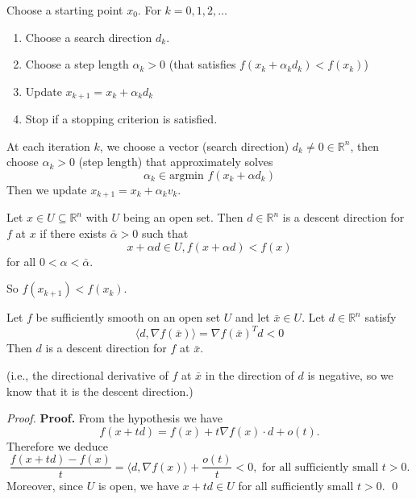 Choose a starting point $x_0$. For $k = 0,1,2,\ldots$
\begin{enumerate}
  \item Choose a search direction $d_k$.
  \item Choose a step length $\alpha_k > 0$ (that satisfies $f(x_k + \alpha_k d_k) < f(x_k)$)
  \item Update $x_{k+1} = x_k + \alpha_k d_k$
  \item Stop if a stopping criterion is satisfied.
\end{enumerate}
\begin{definition}
  At each iteration $k$, we choose a vector (search direction) $d_k \neq 0 \in \mathbb R^n$, then choose $\alpha_k > 0$ (step length) that approximately solves
$$\alpha_k \in \text{argmin } f(x_k + \alpha d_k)$$
Then we update $x_{k+1} = x_k + \alpha_k v_k$.
\end{definition}
\begin{definition}
  Let $x \in U \subseteq \mathbb R^n$ with $U$ being an open set. Then $d \in \mathbb R^n$ is a descent direction for $f$ at $x$ if there exists $\bar \alpha > 0$ such that $$x + \alpha d \in U, f(x + \alpha d) < f(x)$$ for all $0 < \alpha < \bar \alpha$.

  \bigskip So $f(x_{k+1}) < f(x_k)$.
\end{definition}
\begin{lemma}
  Let $f$ be sufficiently smooth on an open set $U$ and let $\bar x \in U$. Let $d \in \mathbb R^n$ satisfy $$\langle d, \nabla f(\bar x) \rangle = \nabla f(\bar x)^T d < 0$$ Then $d$ is a descent direction for $f$ at $\bar x$.

  \bigskip (i.e., the directional derivative of $f$ at $\bar x$ in the direction of $d$ is negative, so we know that it is the descent direction.)
\end{lemma}

\begin{proof}
  \textbf{Proof.} From the hypothesis we have
\[
f(x + td) = f(x) + t \nabla f(x) \cdot d + o(t).
\]
Therefore we deduce
\[
\frac{f(x + td) - f(x)}{t} = \langle d, \nabla f(x) \rangle + \frac{o(t)}{t} < 0, \text{ for all sufficiently small } t > 0.
\]
Moreover, since $U$ is open, we have $x + td \in U$ for all sufficiently small $t > 0$. \qed

\end{proof}

